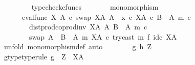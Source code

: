 \begin{isabellebody}
\ \ \ \ \ \ \isamarkupfalse%
\ \ typecheck{\isacharunderscore}{\kern0pt}cfuncs\isanewline
\ \ \ \ \isamarkupfalse%
\ \isamarkupfalse%
\ {\isachardoublequoteopen}monomorphism\isanewline
\ \ \ \ \ \ {\isacharparenleft}{\kern0pt}{\isacharparenleft}{\kern0pt}{\isacharparenleft}{\kern0pt}eval{\isacharunderscore}{\kern0pt}func\ X\ A\ {\isasymcirc}\isactrlsub c\ swap\ {\isacharparenleft}{\kern0pt}X\isactrlbsup A\isactrlesup {\isacharparenright}{\kern0pt}\ A{\isacharparenright}{\kern0pt}\ {\isasymamalg}\ {\isacharparenleft}{\kern0pt}x\ {\isasymcirc}\isactrlsub c\ {\isasymbeta}\isactrlbsub X\isactrlbsup A\isactrlesup \ {\isasymtimes}\isactrlsub c\ {\isacharparenleft}{\kern0pt}B\ {\isasymsetminus}\ {\isacharparenleft}{\kern0pt}A{\isacharcomma}{\kern0pt}\ m{\isacharparenright}{\kern0pt}{\isacharparenright}{\kern0pt}\isactrlesub {\isacharparenright}{\kern0pt}\ {\isasymcirc}\isactrlsub c\isanewline
\ \ \ \ \ \ \ \ dist{\isacharunderscore}{\kern0pt}prod{\isacharunderscore}{\kern0pt}coprod{\isacharunderscore}{\kern0pt}inv\ {\isacharparenleft}{\kern0pt}X\isactrlbsup A\isactrlesup {\isacharparenright}{\kern0pt}\ A\ {\isacharparenleft}{\kern0pt}B\ {\isasymsetminus}\ {\isacharparenleft}{\kern0pt}A{\isacharcomma}{\kern0pt}\ m{\isacharparenright}{\kern0pt}{\isacharparenright}{\kern0pt}\ {\isasymcirc}\isactrlsub c\isanewline
\ \ \ \ \ \ \ \ swap\ {\isacharparenleft}{\kern0pt}A\ {\isasymCoprod}\ {\isacharparenleft}{\kern0pt}B\ {\isasymsetminus}\ {\isacharparenleft}{\kern0pt}A{\isacharcomma}{\kern0pt}\ m{\isacharparenright}{\kern0pt}{\isacharparenright}{\kern0pt}{\isacharparenright}{\kern0pt}\ {\isacharparenleft}{\kern0pt}X\isactrlbsup A\isactrlesup {\isacharparenright}{\kern0pt}\ {\isasymcirc}\isactrlsub c\ try{\isacharunderscore}{\kern0pt}cast\ m\ {\isasymtimes}\isactrlsub f\ id\isactrlsub c\ {\isacharparenleft}{\kern0pt}X\isactrlbsup A\isactrlesup {\isacharparenright}{\kern0pt}{\isacharparenright}{\kern0pt}\isactrlsup {\isasymsharp}{\isacharparenright}{\kern0pt}{\isachardoublequoteclose}\isanewline
\ \ \ \ \isamarkupfalse%
\ {\isacharparenleft}{\kern0pt}unfold\ monomorphism{\isacharunderscore}{\kern0pt}def{}{\isacharcomma}{\kern0pt}\ auto{\isacharparenright}{\kern0pt}\isanewline
\ \ \ \ \ \ \isamarkupfalse%
\ g\ h\ Z\isanewline
\ \ \ \ \ \ \isamarkupfalse%
\ g{\isacharunderscore}{\kern0pt}type{\isacharbrackleft}{\kern0pt}type{\isacharunderscore}{\kern0pt}rule{\isacharbrackright}{\kern0pt}{\isacharcolon}{\kern0pt}\ {\isachardoublequoteopen}g\ {\isacharcolon}{\kern0pt}\ Z\ {\isasymrightarrow}\ X\isactrlbsup A\isactrlesup {\isachardoublequoteclose}\isanewline

\end{isabellebody}
